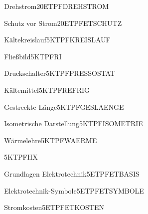 \documentclass[bsz-mkk-exam,ka]{teacher}
\begin{document}
\begin{examaufgabe}{Drehstrom}{20}{ET}{PF}{DREHSTROM}
\end{examaufgabe}

\begin{examaufgabe}{Schutz vor Strom}{20}{ET}{PF}{ETSCHUTZ}
\end{examaufgabe}

\begin{examaufgabe}{Kältekreislauf}{5}{KT}{PF}{KREISLAUF}
\end{examaufgabe}

\begin{examaufgabe}{Fließbild}{5}{KT}{PF}{RI}
\end{examaufgabe}

\begin{examaufgabe}{Druckschalter}{5}{KT}{PF}{PRESSOSTAT}
\end{examaufgabe}

\begin{examaufgabe}{Kältemittel}{5}{KT}{PF}{REFRIG}
\end{examaufgabe}

\begin{examaufgabe}{Gestreckte Länge}{5}{KT}{PF}{GESLAENGE}
\end{examaufgabe}

\begin{examaufgabe}{Isometrische Darstellung}{5}{KT}{PF}{ISOMETRIE}
\end{examaufgabe}

\begin{examaufgabe}{Wärmelehre}{5}{KT}{PF}{WAERME}
\end{examaufgabe}

\begin{examaufgabe}{\hxdia}{5}{KT}{PF}{HX}
\end{examaufgabe}

\begin{examaufgabe}{Grundlagen Elektrotechnik}{5}{ET}{PF}{ETBASIS}
\end{examaufgabe}

\begin{examaufgabe}{Elektrotechnik-Symbole}{5}{ET}{PF}{ETSYMBOLE}
\end{examaufgabe}

\begin{examaufgabe}{Stromkosten}{5}{ET}{PF}{ETKOSTEN}
\end{examaufgabe}
\end{document}
